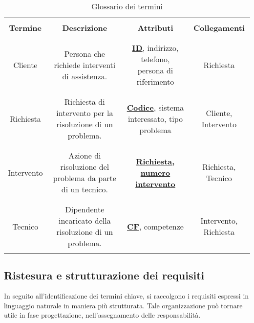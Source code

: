 \documentclass{article}
\begin{document}
\begin{table}[h!]
    \centering
    \begin{adjustbox}{width=1\textwidth}
        \begin{tabular}{|c|c|c|c|}
            \hline &&& \\ 
            \textbf{Termine} & \textbf{Descrizione} & \textbf{Attributi} & \textbf{Collegamenti} \\ &&& \\ 
            \hline &&& \\ 
            Cliente & Persona che richiede interventi di assistenza. & \underline{\textbf{ID}}, indirizzo, telefono, persona di riferimento  & Richiesta \\ &&& \\
            \hline &&& \\ 
            Richiesta & Richiesta di intervento per la risoluzione di un problema. & \underline{\textbf{Codice}}, sistema interessato, tipo problema  & Cliente, Intervento\\ &&& \\ 
            \hline &&& \\ 
            Intervento & Azione di risoluzione del problema da parte di un tecnico. & \underline{\textbf{Richiesta, numero intervento}} & Richiesta, Tecnico\\ &&& \\ 
            \hline &&& \\ 
            Tecnico & Dipendente incaricato della risoluzione di un problema. & \underline{\textbf{CF}}, competenze & Intervento, Richiesta\\ &&& \\ 
            \hline
        \end{tabular}
    \end{adjustbox}
    \caption{Glossario dei termini}
    \label{tab:glossario}
\end{table}

\newpage

\subsection{Ristesura e strutturazione dei requisiti}

In seguito all'identificazione dei termini chiave, si raccolgono i requisiti espressi in linguaggio naturale in maniera più strutturata. Tale organizzazione può tornare utile in fase progettazione, nell'assegnamento delle responsabilità.
\end{document}
